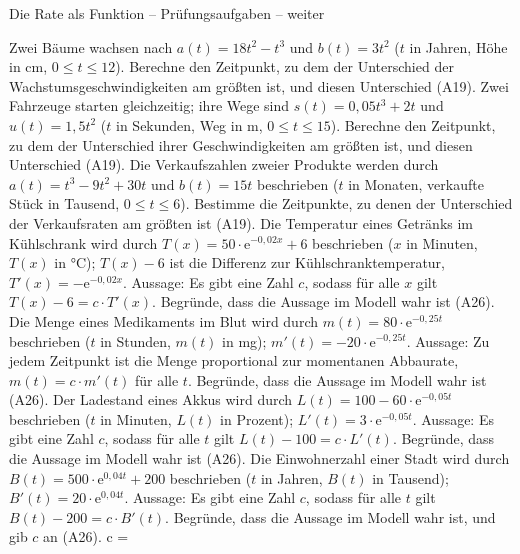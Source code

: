 \begin{aufgabe}{Die Rate als Funktion – Prüfungsaufgaben – weiter}
\begin{teile}
\teil Zwei Bäume wachsen nach $a(t) = 18t^2 - t^3$ und $b(t) = 3t^2$ ($t$ in Jahren, Höhe in cm, $0 \le t \le 12$). Berechne den Zeitpunkt, zu dem der Unterschied der Wachstumsgeschwindigkeiten am größten ist, und diesen Unterschied \hfill (A19).
\teil Zwei Fahrzeuge starten gleichzeitig; ihre Wege sind $s(t) = 0{,}05t^3 + 2t$ und $u(t) = 1{,}5t^2$ ($t$ in Sekunden, Weg in m, $0 \le t \le 15$). Berechne den Zeitpunkt, zu dem der Unterschied ihrer Geschwindigkeiten am größten ist, und diesen Unterschied \hfill (A19).
\teil Die Verkaufszahlen zweier Produkte werden durch $a(t) = t^3 - 9t^2 + 30t$ und $b(t) = 15t$ beschrieben ($t$ in Monaten, verkaufte Stück in Tausend, $0 \le t \le 6$). Bestimme die Zeitpunkte, zu denen der Unterschied der Verkaufsraten am größten ist \hfill (A19).
\teil Die Temperatur eines Getränks im Kühlschrank wird durch $T(x) = 50 \cdot \mathrm{e}^{-0{,}02x} + 6$ beschrieben ($x$ in Minuten, $T(x)$ in °C); $T(x) - 6$ ist die Differenz zur Kühlschranktemperatur, $T'(x) = -\mathrm{e}^{-0{,}02x}$. Aussage: Es gibt eine Zahl $c$, sodass für alle $x$ gilt $T(x) - 6 = c \cdot T'(x)$. Begründe, dass die Aussage im Modell wahr ist \hfill (A26).
\teil Die Menge eines Medikaments im Blut wird durch $m(t) = 80 \cdot \mathrm{e}^{-0{,}25t}$ beschrieben ($t$ in Stunden, $m(t)$ in mg); $m'(t) = -20 \cdot \mathrm{e}^{-0{,}25t}$. Aussage: Zu jedem Zeitpunkt ist die Menge proportional zur momentanen Abbaurate, $m(t) = c \cdot m'(t)$ für alle $t$. Begründe, dass die Aussage im Modell wahr ist \hfill (A26).
\teil Der Ladestand eines Akkus wird durch $L(t) = 100 - 60 \cdot \mathrm{e}^{-0{,}05t}$ beschrieben ($t$ in Minuten, $L(t)$ in Prozent); $L'(t) = 3 \cdot \mathrm{e}^{-0{,}05t}$. Aussage: Es gibt eine Zahl $c$, sodass für alle $t$ gilt $L(t) - 100 = c \cdot L'(t)$. Begründe, dass die Aussage im Modell wahr ist \hfill (A26).
\teil Die Einwohnerzahl einer Stadt wird durch $B(t) = 500 \cdot \mathrm{e}^{0{,}04t} + 200$ beschrieben ($t$ in Jahren, $B(t)$ in Tausend); $B'(t) = 20 \cdot \mathrm{e}^{0{,}04t}$. Aussage: Es gibt eine Zahl $c$, sodass für alle $t$ gilt $B(t) - 200 = c \cdot B'(t)$. Begründe, dass die Aussage im Modell wahr ist, und gib $c$ an \hfill (A26). c = \leerfeld
\end{teile}
\end{aufgabe}

